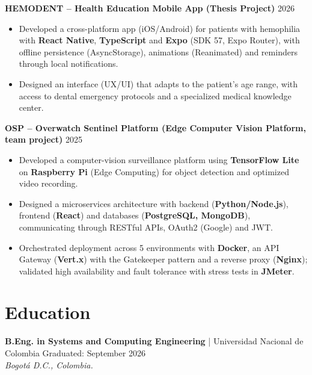 \documentclass[11pt,a4paper]{article}
\begin{document}
\vspace{0.2cm}

\noindent
\textbf{HEMODENT – Health Education Mobile App (Thesis Project)} \hfill 2026
\begin{itemize}[leftmargin=*, noitemsep, topsep=2pt]
    \item Developed a cross-platform app (iOS/Android) for patients with hemophilia with \textbf{React Native}, \textbf{TypeScript} and \textbf{Expo} (SDK 57, Expo Router), with offline persistence (AsyncStorage), animations (Reanimated) and reminders through local notifications.
    \item Designed an interface (UX/UI) that adapts to the patient's age range, with access to dental emergency protocols and a specialized medical knowledge center.
\end{itemize}

\vspace{0.2cm}

\noindent
\textbf{OSP – Overwatch Sentinel Platform (Edge Computer Vision Platform, team project)} \hfill 2025
\begin{itemize}[leftmargin=*, noitemsep, topsep=2pt]
    \item Developed a computer-vision surveillance platform using \textbf{TensorFlow Lite} on \textbf{Raspberry Pi} (Edge Computing) for object detection and optimized video recording.
    \item Designed a microservices architecture with backend (\textbf{Python/Node.js}), frontend (\textbf{React}) and databases (\textbf{PostgreSQL, MongoDB}), communicating through RESTful APIs, OAuth2 (Google) and JWT.
    \item Orchestrated deployment across 5 environments with \textbf{Docker}, an API Gateway (\textbf{Vert.x}) with the Gatekeeper pattern and a reverse proxy (\textbf{Nginx}); validated high availability and fault tolerance with stress tests in \textbf{JMeter}.
\end{itemize}

\section*{Education}

\noindent
\textbf{B.Eng. in Systems and Computing Engineering} | Universidad Nacional de Colombia \hfill Graduated: September 2026 \\
\textit{Bogotá D.C., Colombia.}

\vspace{0.2cm}
\end{document}
